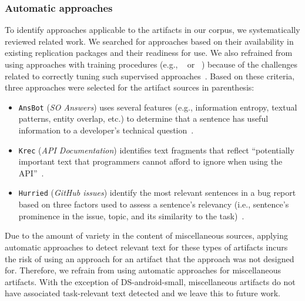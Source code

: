\subsubsection{Automatic approaches}


To identify approaches applicable to the artifacts in our corpus, we systematically reviewed related work. We searched for approaches based on their availability in existing replication packages and their readiness for use.
We also refrained from using approaches with training procedures (e.g., ~\cite{liu2020} or ~\cite{Treude2016}) because of the challenges related to correctly tuning such supervised approaches~\cite{Chaparro2017, fucci2019}. Based on these criteria, three approaches were selected for the artifact sources in parenthesis:


\begin{itemize}[leftmargin=\parindent, font=\normalfont\itshape]
    \item \texttt{\acs{AnsBot}} (\textit{SO Answers}) uses several features (e.g., information entropy, textual patterns, entity overlap, etc.) to determine that a sentence has useful information to a developer's technical question~\cite{Xu2017}.
    
    \item \texttt{\acs{Krec}} (\textit{API Documentation}) identifies text fragments that reflect ``potentially important text that programmers cannot afford to ignore when using the API''~\cite{Robillard2015}.
    
    \item \texttt{\acs{Hurried}} (\textit{GitHub issues}) identify the most relevant sentences in a bug report based on three factors used to assess a sentence's relevancy (i.e., sentence's prominence in the issue, topic, and its similarity to the task)~\cite{Lotufo2012}.
\end{itemize}



Due to the amount of variety in the content of miscellaneous sources, 
applying automatic approaches to detect relevant text for these types of artifacts
incurs the risk of using an approach for an artifact that the approach was not designed for.
Therefore, we refrain from using automatic approaches for miscellaneous artifacts.
With the exception of \acs{DS-android-small}, miscellaneous artifacts do not have associated task-relevant text detected and we leave this to future work.



